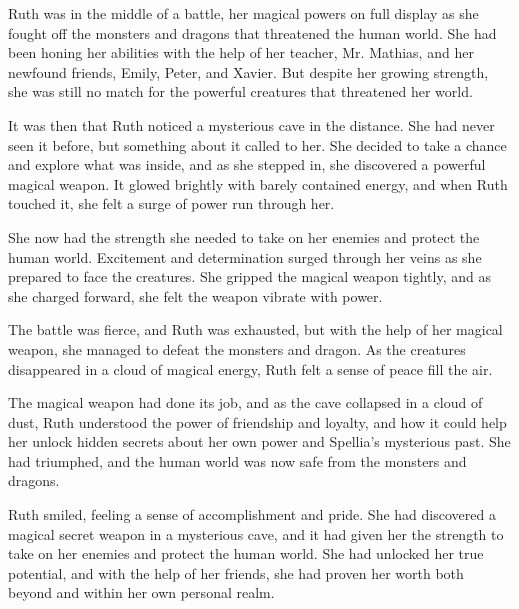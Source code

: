 

Ruth was in the middle of a battle, her magical powers on full display as she fought off the monsters and dragons that threatened the human world. She had been honing her abilities with the help of her teacher, Mr. Mathias, and her newfound friends, Emily, Peter, and Xavier. But despite her growing strength, she was still no match for the powerful creatures that threatened her world. 

It was then that Ruth noticed a mysterious cave in the distance. She had never seen it before, but something about it called to her. She decided to take a chance and explore what was inside, and as she stepped in, she discovered a powerful magical weapon. It glowed brightly with barely contained energy, and when Ruth touched it, she felt a surge of power run through her. 

She now had the strength she needed to take on her enemies and protect the human world. Excitement and determination surged through her veins as she prepared to face the creatures. She gripped the magical weapon tightly, and as she charged forward, she felt the weapon vibrate with power. 

The battle was fierce, and Ruth was exhausted, but with the help of her magical weapon, she managed to defeat the monsters and dragon. As the creatures disappeared in a cloud of magical energy, Ruth felt a sense of peace fill the air. 

The magical weapon had done its job, and as the cave collapsed in a cloud of dust, Ruth understood the power of friendship and loyalty, and how it could help her unlock hidden secrets about her own power and Spellia's mysterious past. She had triumphed, and the human world was now safe from the monsters and dragons. 

Ruth smiled, feeling a sense of accomplishment and pride. She had discovered a magical secret weapon in a mysterious cave, and it had given her the strength to take on her enemies and protect the human world. She had unlocked her true potential, and with the help of her friends, she had proven her worth both beyond and within her own personal realm.